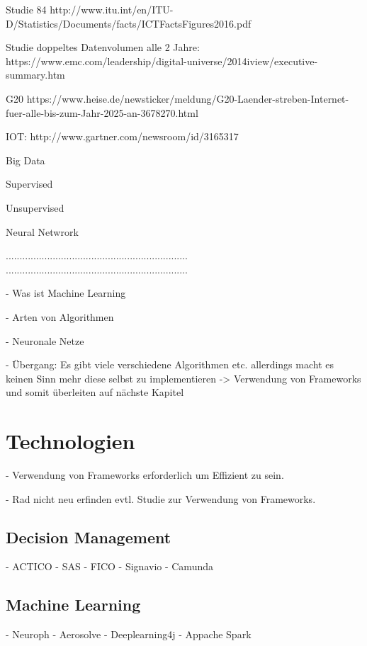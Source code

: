 Studie 84%
http://www.itu.int/en/ITU-D/Statistics/Documents/facts/ICTFactsFigures2016.pdf 

Studie doppeltes Datenvolumen alle 2 Jahre:
https://www.emc.com/leadership/digital-universe/2014iview/executive-summary.htm

G20
https://www.heise.de/newsticker/meldung/G20-Laender-streben-Internet-fuer-alle-bis-zum-Jahr-2025-an-3678270.html

IOT:
http://www.gartner.com/newsroom/id/3165317

Big Data

Supervised 

Unsupervised

Neural Netwrork

..................................................................
..................................................................

- Was ist Machine Learning

- Arten von Algorithmen 

- Neuronale Netze 

- Übergang: Es gibt viele verschiedene Algorithmen etc. allerdings macht es keinen Sinn mehr diese selbst zu implementieren -> Verwendung von Frameworks und somit überleiten auf nächste Kapitel

\section{Technologien}
\label{sec:Technologien2}

- Verwendung von Frameworks erforderlich um Effizient zu sein.

- Rad nicht neu erfinden evtl. Studie zur Verwendung von Frameworks.

\subsection{Decision Management}
\label{subsec:Decision_Management2}

- ACTICO 
- SAS
- FICO 
- Signavio
- Camunda

\subsection{Machine Learning}
\label{subsec:Machine_Learning2}

- Neuroph
- Aerosolve 
- Deeplearning4j
- Appache Spark

